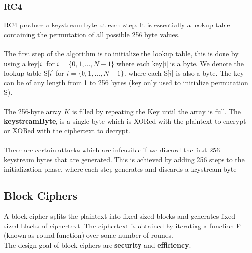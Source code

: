 \documentclass{article}
\begin{document}
\subsubsection{RC4}
RC4 produce a keystream byte at each step. It is essentially a lookup table containing the permutation of all possible 256 byte values.\\\\
The first step of the algorithm is to initialize the lookup table, this is done by using a key[$i$] for $i = \{0,1,...,N-1\}$ where each key[i] is a byte. We denote the lookup table S[$i$] for $i = \{0,1,...,N-1\}$, where each S[$i$] is also a byte. The key can be of any length from 1 to 256 bytes (key only used to initialize permutation S).\\\\
The 256-byte array $K$ is filled by repeating the Key until the array is full. The \textbf{keystreamByte}, is a single byte which is XORed with the plaintext to encrypt or XORed with the ciphertext to decrypt.\\\\
There are certain attacks which are infeasible if we discard the first 256 keystream bytes that are generated. This is achieved by adding 256 steps to the initialization phase, where each step generates and discards a keystream byte

\subsection{Block Ciphers}
A block cipher splits the plaintext into fixed-sized blocks and generates fixed-sized blocks of ciphertext. The ciphertext is obtained by iterating a function F (known as round function) over some number of rounds.\\
The design goal of block ciphers are \textbf{security} and \textbf{efficiency}.
\end{document}
